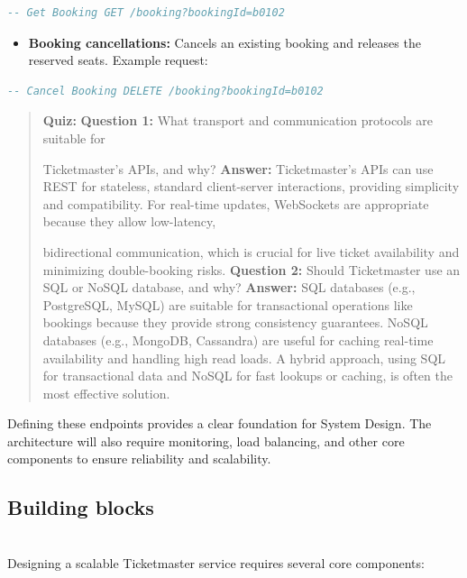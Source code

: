 \begin{lstlisting}[language=haskell]
-- Get Booking GET /booking?bookingId=b0102
\end{lstlisting}

\begin{itemize}
\item
\protect{}\label{x0orPf1DwGyD6ei1Jvs8K}
\textbf{Booking cancellations:} Cancels an existing booking and releases the reserved seats. Example request:
\end{itemize}

\begin{lstlisting}[language=haskell]
-- Cancel Booking DELETE /booking?bookingId=b0102
\end{lstlisting}

\begin{quote}
\textbf{Quiz:}
\textbf{Question 1:} What transport and communication protocols are suitable for

Ticketmaster's APIs, and why?
\textbf{Answer:} Ticketmaster's APIs can use REST for stateless, standard client-server interactions, providing simplicity and compatibility. For real-time updates, WebSockets are appropriate because they allow low-latency,

bidirectional communication, which is crucial for live ticket availability and minimizing double-booking risks.
\textbf{Question 2:} Should Ticketmaster use an SQL or NoSQL database, and why?
\textbf{Answer:} SQL databases (e.g., PostgreSQL, MySQL) are suitable for transactional operations like bookings because they provide strong consistency guarantees. NoSQL databases (e.g., MongoDB, Cassandra) are useful for caching real-time availability and handling high read loads. A hybrid approach, using SQL for transactional data and NoSQL for fast lookups or caching, is often the most effective solution.
\end{quote}

Defining these endpoints provides a clear foundation for System Design. The architecture will also require monitoring, load balancing, and other core components to ensure reliability and scalability.

\subsection{Building blocks}\label{lpXYeE2Yw4HsuutalcWl0}
\\
Designing a scalable Ticketmaster service requires several core components:

